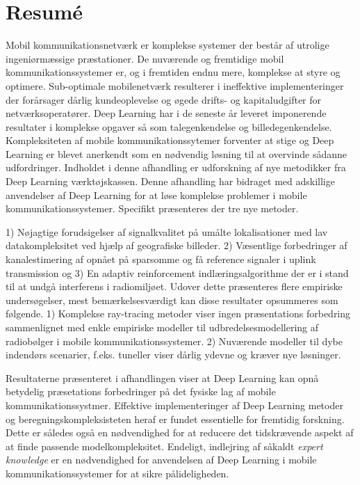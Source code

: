 \chapter*{Resumé}
Mobil kommunikationsnetværk er komplekse systemer der består af utrolige ingeniørmæssige præstationer. De nuværende og fremtidige mobil kommunikationssystemer er, og i fremtiden endnu mere, komplekse at styre og optimere. Sub-optimale mobilenetværk resulterer i ineffektive implementeringer der forårsager dårlig kundeoplevelse og øgede drifts- og kapitaludgifter for netværksoperatører. Deep Learning har i de seneste år leveret imponerende resultater i komplekse opgaver så som talegenkendelse og billedegenkendelse. Kompleksiteten af mobile kommunikationssytemer forventer at stige og Deep Learning er blevet anerkendt som en nødvendig løsning til at overvinde sådanne udfordringer. Indholdet i denne afhandling er udforskning af nye metodikker fra Deep Learning værktøjskassen. Denne afhandling har bidraget med adskillige anvendelser af Deep Learning for at løse komplekse problemer i mobile kommunikationssystemer. Specifikt præsenteres der tre nye metoder.

1) Nøjagtige forudsigelser af signalkvalitet på umålte lokalisationer med lav datakompleksitet ved hjælp af geografiske billeder. 2) Væsentlige forbedringer af kanalestimering af opnået på sparsomme og få reference signaler i uplink transmission og 3) En adaptiv reinforcement indlæringsalgorithme der er i stand til at undgå interferens i radiomiljøet. Udover dette præsenteres flere empiriske undersøgelser, mest bemærkelsesværdigt kan disse resultater opsummeres som følgende. 1) Komplekse ray-tracing metoder viser ingen præsentations forbedring sammenlignet med enkle empiriske modeller til udbredelsesmodellering af radiobølger i mobile kommunikationssystemer. 2) Nuværende modeller til dybe indendørs scenarier, f.eks. tuneller viser dårlig ydevne og kræver nye løsninger.

Resultaterne præsenteret i afhandlingen viser at Deep Learning kan opnå betydelig præsetations forbedringer på det fysiske lag af mobile kommunikationssystmer. Effektive implementeringer af Deep Learning metoder og beregningskompleksisteten heraf er fundet essentielle for fremtidig forskning. Dette er således også en nødvendighed for at reducere det tidskrævende aspekt af at finde passende modelkompleksitet. Endeligt, indlejring af såkaldt \emph{expert knowledge} er en nødvendighed for anvendelsen af Deep Learning i mobile kommunikationssystemer for at sikre pålideligheden.